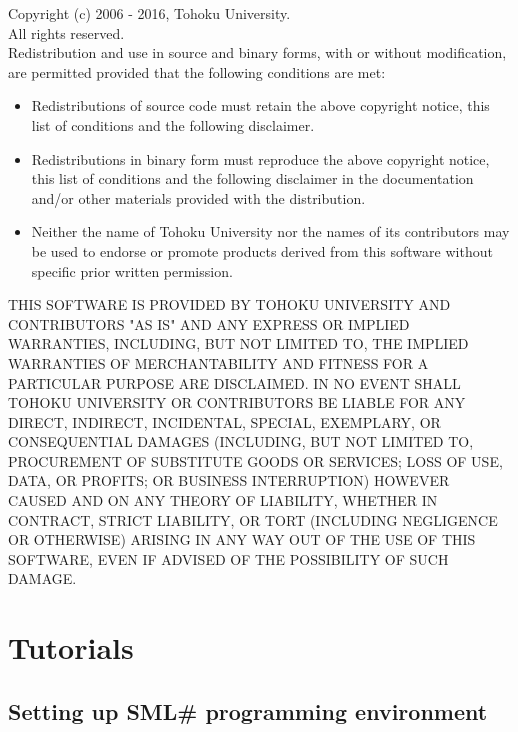 \documentclass{jbook}
\newcommand{\txt}[2]{#2}
\newcommand{\smlsharp}{SML\#}
\begin{document}
Copyright (c) 2006 - 2016, Tohoku University.\\
All rights reserved.\\

Redistribution and use in source and binary forms, with or without
modification, are permitted provided that the following conditions are
met:

\begin{itemize}
\item 
  Redistributions of source code must retain the above copyright
  notice, this list of conditions and the following disclaimer. 
\item 
  Redistributions in binary form must reproduce the above
  copyright notice, this list of conditions and the following disclaimer
  in the documentation and/or other materials provided with the
  distribution. 
\item 
  Neither the name of Tohoku University nor the names of its
  contributors may be used to endorse or promote products derived from
  this software without specific prior written permission.  
\end{itemize}

THIS SOFTWARE IS PROVIDED BY TOHOKU UNIVERSITY AND CONTRIBUTORS "AS IS"
AND ANY EXPRESS OR IMPLIED WARRANTIES, INCLUDING, BUT NOT LIMITED TO,
THE IMPLIED WARRANTIES OF MERCHANTABILITY AND FITNESS FOR A PARTICULAR
PURPOSE ARE DISCLAIMED. IN NO EVENT SHALL TOHOKU UNIVERSITY OR
CONTRIBUTORS BE LIABLE FOR ANY DIRECT, INDIRECT, INCIDENTAL, SPECIAL,
EXEMPLARY, OR CONSEQUENTIAL DAMAGES (INCLUDING, BUT NOT LIMITED TO,
PROCUREMENT OF SUBSTITUTE GOODS OR SERVICES; LOSS OF USE, DATA, OR
PROFITS; OR BUSINESS INTERRUPTION) HOWEVER CAUSED AND ON ANY THEORY OF
LIABILITY, WHETHER IN CONTRACT, STRICT LIABILITY, OR TORT (INCLUDING
NEGLIGENCE OR OTHERWISE) ARISING IN ANY WAY OUT OF THE USE OF THIS
SOFTWARE, EVEN IF ADVISED OF THE POSSIBILITY OF SUCH DAMAGE.

% 
\part{\txt{チュートリアル}{Tutorials}}
\label{part:tutorial}

\chapter{\txt{\smlsharp{}プログラミング環境の準備}
{Setting up \smlsharp{} programming environment}
}
\label{chap:tutorialEnvironment}
\end{document}
